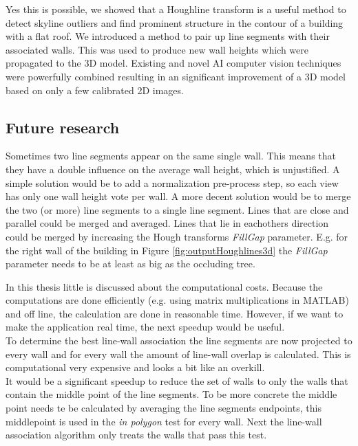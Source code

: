 Yes this is possible, we showed that a Houghline transform is a useful method to detect
skyline outliers and find prominent structure in the contour of a building with a flat
roof. We introduced a method to pair up line segments with their associated
walls. This was used to produce new wall heights which were propagated to the 3D
model.  Existing and novel AI computer vision techniques were powerfully
combined resulting in an significant improvement of a 3D model based on only a
few calibrated 2D images. 

\subsection{Future research}
Sometimes two line segments appear on the same single wall. This means that they have a double
influence on the average wall height, which is unjustified. 
A simple solution would be to add a normalization pre-process step, so each view
has only one wall height vote per wall. A more decent solution would be to
merge the two (or more) line segments to a single line segment. 
Lines that are close and parallel could be merged and averaged.
Lines that lie in eachothers direction could be merged by increasing the 
Hough transforms \emph{FillGap} parameter.  E.g. for the right wall of the building in 
Figure \ref{fig:outputHoughlines3d} the \emph{FillGap} parameter needs to be at
least as big as the occluding tree.


In this thesis little is discussed about the computational costs. Because the 
computations are done efficiently (e.g. using matrix multiplications
in MATLAB) and off line, the calculation are done in reasonable time.
However, if we want to make the application real time, the next speedup would be useful.\\
To determine the best line-wall association the line segments are now projected to
every wall and for every wall the amount of line-wall overlap is calculated. This
is computational very expensive and looks a bit like an overkill.\\

It would be a significant speedup to reduce the set of walls to only the walls
that contain the middle point of the line segments. To be more concrete the
middle point needs te be calculated by averaging the line segments endpoints,
this middlepoint is used in the \emph{in polygon} test for every wall.  Next the
line-wall association algorithm only treats the walls that pass this test.

